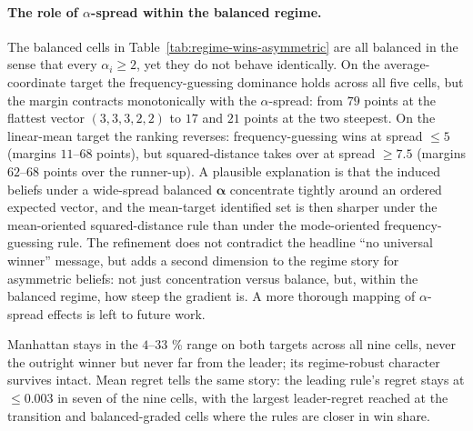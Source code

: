 \paragraph{The role of \(\alpha\)-spread within the balanced regime.}
The balanced cells in Table~\ref{tab:regime-wins-asymmetric} are all balanced in the sense that every \(\alpha_i\ge 2\), yet they do not behave identically.
On the average-coordinate target the frequency-guessing dominance holds across all five cells, but the margin contracts monotonically with the \(\alpha\)-spread: from \(79\) points at the flattest vector \((3,3,3,2,2)\) to \(17\) and \(21\) points at the two steepest.
On the linear-mean target the ranking reverses: frequency-guessing wins at spread \(\le 5\) (margins \(11\)--\(68\) points), but squared-distance takes over at spread \(\ge 7.5\) (margins \(62\)--\(68\) points over the runner-up).
A plausible explanation is that the induced beliefs under a wide-spread balanced \(\boldsymbol\alpha\) concentrate tightly around an ordered expected vector, and the mean-target identified set is then sharper under the mean-oriented squared-distance rule than under the mode-oriented frequency-guessing rule.
The refinement does not contradict the headline ``no universal winner'' message, but adds a second dimension to the regime story for asymmetric beliefs: not just concentration versus balance, but, within the balanced regime, how steep the gradient is.
A more thorough mapping of \(\alpha\)-spread effects is left to future work.

Manhattan stays in the \(4\)--\(33\) \% range on both targets across all nine cells, never the outright winner but never far from the leader; its regime-robust character survives intact.
Mean regret tells the same story: the leading rule's regret stays at \(\le 0.003\) in seven of the nine cells, with the largest leader-regret reached at the transition and balanced-graded cells where the rules are closer in win share.
